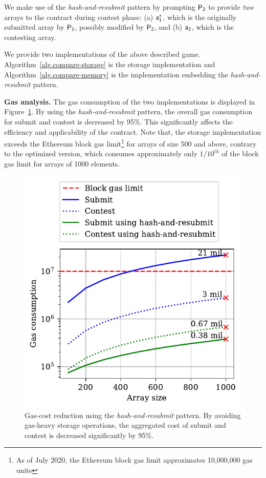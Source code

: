 We make use of the \emph{hash-and-resubmit} pattern by prompting $\mathsf{P_2}$ to
provide \emph{two} arrays to the contract during contest phase: (a) $\mathsf{a_1^*}$,
which is the originally submitted array by $\mathsf{P_1}$, possibly modified by $\mathsf{P_2}$,
and (b) $\mathsf{a_2}$, which is the contesting array.

We provide two implementations of the above described game.
Algorithm~\ref{alg.compare-storage} is the storage implementation and
Algorithm~\ref{alg.compare-memory} is the implementation embedding the
\emph{hash-and-resubmit} pattern.



\noindent \textbf{Gas analysis.} The gas consumption of the two implementations
is displayed in Figure~\ref{fig:har-example}. By using the
\emph{hash-and-resubmit} pattern, the overall gas consumption for
\textsf{submit} and \textsf{contest} is decreased by 95\%. This significantly
affects the efficiency and applicability of the contract. Note that, the
storage implementation exceeds the Ethereum block gas limit\footnote{As of July 2020, the Ethereum block gas limit approximates 10,000,000 gas units} for
arrays of size 500 and above, contrary to the optimized version, which
consumes approximately only $1/10^{th}$ of the block gas limit for arrays of
1000 elements.

\begin{figure}[h!]
\begin{center}
\includegraphics[width=1 \columnwidth]{figures/har-example.pdf}
\end{center}
\caption{Gas-cost reduction using the \emph{hash-and-resubmit} pattern. By
    avoiding gas-heavy storage operations, the aggregated cost of
    \textsf{submit} and \textsf{contest} is decreased significantly by 95\%.}
\label{fig:har-example}
\end{figure}


